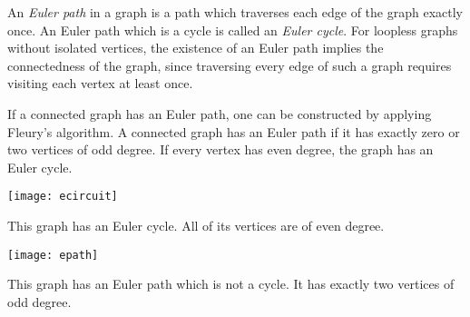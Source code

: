\documentclass{article}
\begin{document}
An \emph{Euler path} in a graph is a path which traverses each edge of the graph exactly once.  An Euler path which is a cycle is called an \emph{Euler cycle}.  For loopless graphs without isolated vertices, the existence of an Euler path implies the connectedness of the graph, since traversing every edge of such a graph requires visiting each vertex at least once.

If a connected graph has an Euler path, one can be constructed by applying Fleury's algorithm.  A connected graph has an Euler path if it has exactly zero or two vertices of odd degree.  If every vertex has even degree, the graph has an Euler cycle.

\begin{center}
\texttt{[image: ecircuit]}
\end{center}

This graph has an Euler cycle.  All of its vertices are of even degree.

\begin{center}
\texttt{[image: epath]}
\end{center}

This graph has an Euler path which is not a cycle. It has exactly two vertices of odd degree.
\end{document}
